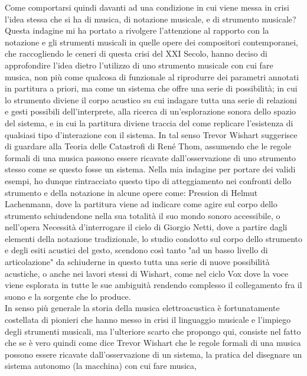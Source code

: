 Come comportarsi quindi davanti ad una condizione in cui viene messa in crisi l'idea stessa
che si ha di musica, di notazione musicale, e di strumento musicale?\\
Questa indagine mi ha portato a rivolgere l'attenzione al rapporto con la notazione 
e gli strumenti musicali in quelle opere dei compositori contemporanei, 
che raccogliendo le ceneri di questa crisi del XXI Secolo, 
hanno deciso di approfondire l'idea dietro l'utilizzo
di uno strumento musicale con cui fare musica, non più come 
qualcosa di funzionale al riprodurre dei parametri annotati in partitura a priori,
ma come un sistema che offre una serie di possibilità; 
in cui lo strumento diviene il corpo acustico su cui indagare 
tutta una serie di relazioni e gesti possibili dell'interprete, 
alla ricerca di un'esplorazione sonora dello spazio del sistema,
e in cui la partitura diviene traccia del come replicare l'esistenza di 
qualsiasi tipo d'interazione con il sistema.
In tal senso Trevor Wishart suggerisce di guardare alla Teoria delle Catastrofi 
di René Thom, assumendo che le regole formali di una musica passono
essere ricavate dall'osservazione di uno strumento stesso come se questo fosse un sistema.
Nella mia indagine per portare dei validi esempi, ho dunque rintracciato questo tipo di atteggiamento 
nei confronti dello strumento
e della notazione in alcune opere come: Pression di Helmut Lachenmann,
dove la partitura viene ad indicare come agire sul corpo dello strumento
schiudendone nella sua totalità il suo mondo sonoro accessibile,
o nell'opera Necessità d'interrogare il cielo di Giorgio Netti,
dove a partire dagli elementi della notazione tradizionale, lo studio condotto 
sul corpo dello strumento e degli esiti acustici del gesto, scendono così tanto 
"ad un basso livello di articolazione" da schiuderne in questo tutta una serie di nuove possibilità
acustiche, o anche nei lavori stessi di Wishart, come nel ciclo Vox 
dove la voce viene esplorata in tutte le sue ambiguità rendendo
complesso il collegamento fra il suono e la sorgente che lo produce. \\
In senso più generale la storia della musica elettroacustica è fortunatamente costellata 
di pionieri che hanno messo in crisi il linguaggio musicale e l'impiego degli strumenti musicali,
ma l'ulteriore scarto che propongo qui, consiste nel fatto che se è vero quindi come 
dice Trevor Wishart che le regole formali di una musica possono
essere ricavate dall'osservazione di un sistema, 
la pratica del disegnare un sistema autonomo (la macchina) con cui fare musica,

